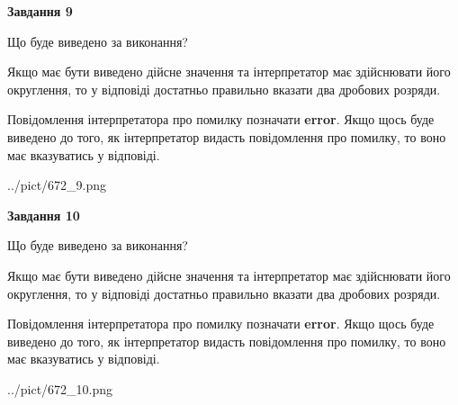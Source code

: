 \documentclass[12pt, ukrainian]{article}
\begin{document}
{\begin {Large}
{\begin {center}\textbf{Завдання 9}\end {center}}\par
Що буде виведено за виконання? \par

Якщо має бути виведено дійсне значення та інтерпретатор має здійснювати його округлення, 
то у відповіді достатньо правильно вказати два дробових розряди.

Повідомлення інтерпретатора про помилку позначати \textbf{error}.
Якщо щось буде виведено до того, як інтерпретатор видасть повідомлення про помилку, 
то воно має вказуватись у відповіді. \par

\begin{center}
	{../pict/672_9.png}
\end{center}
\newpage

{\begin {center}\textbf{Завдання 10}\end {center}}\par
Що буде виведено за виконання? \par

Якщо має бути виведено дійсне значення та інтерпретатор має здійснювати його округлення, 
то у відповіді достатньо правильно вказати два дробових розряди.

Повідомлення інтерпретатора про помилку позначати \textbf{error}.
Якщо щось буде виведено до того, як інтерпретатор видасть повідомлення про помилку, 
то воно має вказуватись у відповіді. \par

\begin{center}
	{../pict/672_10.png}
\end{center}
\newpage

\end {Large}}
\end{document}
